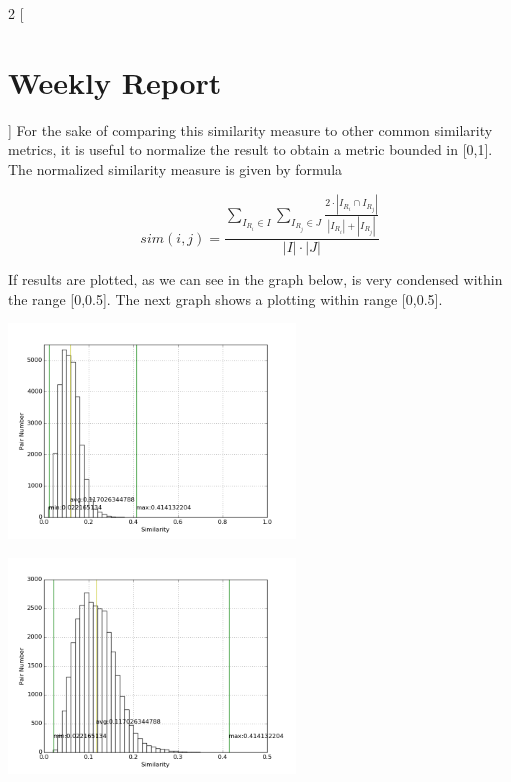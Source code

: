 \documentclass[12pt]{report}
\begin{document}

\begin{multicols}{2}
[\section*{Weekly Report}
]
For the sake of comparing this similarity measure to other common similarity metrics, it is useful to normalize the result to obtain a metric bounded in [0,1]. The normalized similarity measure is given by formula

\begin{equation}
sim(i,j) = \frac{\sum_{I_{R_i} \in I} \sum_{ I_{R_j} \in J} \frac{2 \cdot |I_{R_i} \cap I_{R_j}|}{|I_{R_i}| + |I_{R_j}|}}{|I| \cdot |J|}
\end{equation}

If results are plotted, as we can see in the graph below, is very condensed within the range [0,0.5]. The next graph shows a plotting within range [0,0.5].


\begin{center}
\includegraphics[width=3in]{normalized_similarity_distribution.png}
\end{center}

\begin{center}
\includegraphics[width=3in]{extended_normalized_similarity_distribution.png}
\end{center}


\end{multicols}
\end{document}
